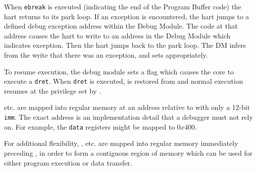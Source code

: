 When {\tt ebreak} is executed (indicating the end of the
Program Buffer code) the hart returns to its park loop. If an exception is
encountered, the hart jumps to a defined debug exception address within
the Debug Module. The code at that address causes the hart to
write to an address in the Debug Module which indicates exception.
Then the hart jumps back to the park loop.
The DM infers from the write that there was an exception, and sets \Fcmderr appropriately.

To resume execution, the debug module sets a flag which causes the core to execute a {\tt dret}.
When {\tt dret} is executed, \Rpc is restored from \Rdpc and normal execution resumes at the
privilege set by \Fprv.

\Rdatazero etc. are mapped into regular memory at an address relative to \Rzero
with only a 12-bit {\tt imm}. The exact address is an implementation
detail that a debugger must not rely on. For example, the {\tt data}
registers might be mapped to $0x400$.

For additional flexibility, \Rprogbufzero, etc. are mapped into regular memory
immediately preceding \Rdatazero, in order to form a contiguous region of memory which
can be used for either program execution or data transfer.
